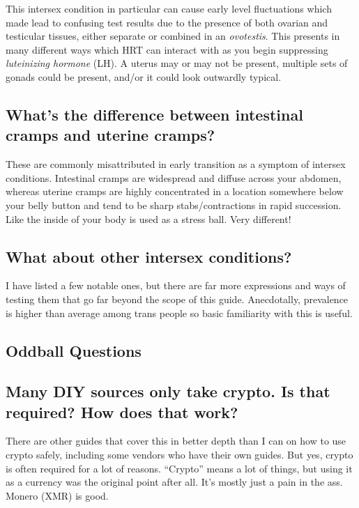\documentclass{article}
\begin{document}
This intersex condition in particular can cause early level fluctuations which made lead to confusing test results due to the presence of both ovarian and testicular tissues, either separate or combined in an \textit{ovotestis}. This presents in many different ways which HRT can interact with as you begin suppressing \textit{luteinizing hormone} (LH). A uterus may or may not be present, multiple sets of gonads could be present, and/or it could look outwardly typical.

\subsection{What’s the difference between intestinal cramps and uterine cramps?}\label{11-35}

These are commonly misattributed in early transition as a symptom of intersex conditions. Intestinal cramps are widespread and diffuse across your abdomen, whereas uterine cramps are highly concentrated in a location somewhere below your belly button and tend to be sharp stabs/contractions in rapid succession. Like the inside of your body is used as a stress ball. Very different!

\subsection{What about other intersex conditions?}

I have listed a few notable ones, but there are far more expressions and ways of testing them that go far beyond the scope of this guide. Anecdotally, prevalence is higher than average among trans people so basic familiarity with this is useful.

\subsection*{Oddball Questions}

\subsection{Many DIY sources only take crypto. Is that required? How does that work?}

There are other guides that cover this in better depth than I can on how to use crypto safely, including some vendors who have their own guides. But yes, crypto is often required for a lot of reasons. “Crypto” means a lot of things, but using it as a currency was the original point after all. It’s mostly just a pain in the ass. Monero (XMR) is good.
\end{document}

